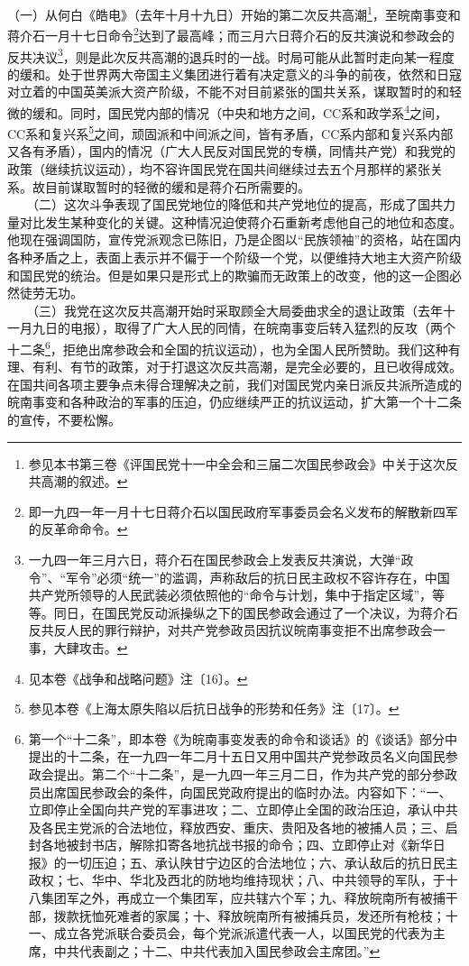 \documentclass[cn,11pt,chinese]{elegantbook}
\begin{document}
（一）从何白《皓电》（去年十月十九日）开始的第二次反共高潮\footnote[1]{ 参见本书第三卷《评国民党十一中全会和三届二次国民参政会》中关于这次反共高潮的叙述。}，至皖南事变和蒋介石一月十七日命令\footnote[2]{ 即一九四一年一月十七日蒋介石以国民政府军事委员会名义发布的解散新四军的反革命命令。}达到了最高峰；而三月六日蒋介石的反共演说和参政会的反共决议\footnote[3]{ 一九四一年三月六日，蒋介石在国民参政会上发表反共演说，大弹“政令”、“军令”必须“统一”的滥调，声称敌后的抗日民主政权不容许存在，中国共产党所领导的人民武装必须依照他的“命令与计划，集中于指定区域”，等等。同日，在国民党反动派操纵之下的国民参政会通过了一个决议，为蒋介石反共反人民的罪行辩护，对共产党参政员因抗议皖南事变拒不出席参政会一事，大肆攻击。}，则是此次反共高潮的退兵时的一战。时局可能从此暂时走向某一程度的缓和。处于世界两大帝国主义集团进行着有决定意义的斗争的前夜，依然和日寇对立着的中国英美派大资产阶级，不能不对目前紧张的国共关系，谋取暂时的和轻微的缓和。同时，国民党内部的情况（中央和地方之间，CC系和政学系\footnote[4]{ 见本卷《战争和战略问题》注〔16〕。}之间，CC系和复兴系\footnote[5]{ 参见本卷《上海太原失陷以后抗日战争的形势和任务》注〔17〕。}之间，顽固派和中间派之间，皆有矛盾，CC系内部和复兴系内部又各有矛盾），国内的情况（广大人民反对国民党的专横，同情共产党）和我党的政策（继续抗议运动），均不容许国民党在国共间继续过去五个月那样的紧张关系。故目前谋取暂时的轻微的缓和是蒋介石所需要的。\\
　　（二）这次斗争表现了国民党地位的降低和共产党地位的提高，形成了国共力量对比发生某种变化的关键。这种情况迫使蒋介石重新考虑他自己的地位和态度。他现在强调国防，宣传党派观念已陈旧，乃是企图以“民族领袖”的资格，站在国内各种矛盾之上，表面上表示并不偏于一个阶级一个党，以便维持大地主大资产阶级和国民党的统治。但是如果只是形式上的欺骗而无政策上的改变，他的这一企图必然徒劳无功。\\
　　（三）我党在这次反共高潮开始时采取顾全大局委曲求全的退让政策（去年十一月九日的电报），取得了广大人民的同情，在皖南事变后转入猛烈的反攻（两个十二条\footnote[6]{ 第一个“十二条”，即本卷《为皖南事变发表的命令和谈话》的《谈话》部分中提出的十二条，在一九四一年二月十五日又用中国共产党参政员名义向国民参政会提出。第二个“十二条”，是一九四一年三月二日，作为共产党的部分参政员出席国民参政会的条件，向国民党政府提出的临时办法。内容如下：“一、立即停止全国向共产党的军事进攻；二、立即停止全国的政治压迫，承认中共及各民主党派的合法地位，释放西安、重庆、贵阳及各地的被捕人员；三、启封各地被封书店，解除扣寄各地抗战书报的命令；四、立即停止对《新华日报》的一切压迫；五、承认陕甘宁边区的合法地位；六、承认敌后的抗日民主政权；七、华中、华北及西北的防地均维持现状；八、中共领导的军队，于十八集团军之外，再成立一个集团军，应共辖六个军；九、释放皖南所有被捕干部，拨款抚恤死难者的家属；十、释放皖南所有被捕兵员，发还所有枪枝；十一、成立各党派联合委员会，每个党派派遣代表一人，以国民党的代表为主席，中共代表副之；十二、中共代表加入国民参政会主席团。”}，拒绝出席参政会和全国的抗议运动），也为全国人民所赞助。我们这种有理、有利、有节的政策，对于打退这次反共高潮，是完全必要的，且已收得成效。在国共间各项主要争点未得合理解决之前，我们对国民党内亲日派反共派所造成的皖南事变和各种政治的军事的压迫，仍应继续严正的抗议运动，扩大第一个十二条的宣传，不要松懈。\\
\end{document}
